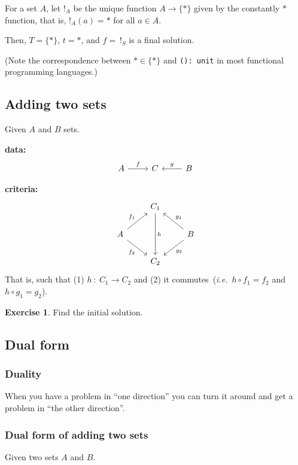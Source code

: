 \documentclass[a4paper, 12pt]{article}
\theoremstyle{definition}
\newtheorem{exercise}{Exercise}
\newcommand{\ie}{\emph{i.e.}}
\newcommand{\setof}[1]{ \{ #1 \} }
\begin{document}
For a set $A$, let $!_A$ be the unique function $A\to \setof{\ast}$ given by
the constantly $\ast$ function, that is, $!_A(a) = \ast$ for all $a\in A$.

Then, $T=\setof{\ast}$, $t=\ast$, and $f=\ !_S$ is a final solution.

(Note the correspondence between $\ast \in \{ \ast \}$ and \texttt{(): unit}
in most functional programming languages.)

\subsection{Adding two sets}

Given $A$ and $B$ sets.

\textbf{data:}
$$
\begin{tikzcd}
    A \arrow[r, "f"] & C & B \arrow[l, swap, "g"]
\end{tikzcd}
$$

\textbf{criteria:}
$$
\begin{tikzcd}
    {} & C_1 \arrow[dd, "h"] & {} \\
    A \arrow[ru, "f_1"] \arrow[rd, swap, "f_2"]
    & {}
    &
    B \arrow[lu, swap, "g_1"] \arrow[ld, "g_2"]
    \\
    {} & C_2 & {}
\end{tikzcd}
$$
That is, such that (1) $h\ :\ C_1 \rightarrow C_2$ and (2) it 
commutes~(\ie~$h \circ f_1 = f_2$ and $h \circ g_1 = g_2$).

\begin{exercise}
    Find the initial solution.
\end{exercise}

\subsection{Dual form}

\subsubsection*{Duality}

When you have a problem in ``one direction'' you can turn it around and get a
problem in ``the other direction''.

\subsubsection*{Dual form of adding two sets}

Given two sets $A$ and $B$.
\end{document}
